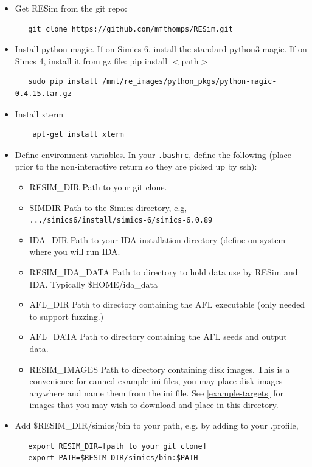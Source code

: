 \documentclass[titlepage]{article}
\begin{document}
\begin{itemize}
\item Get RESim from the git repo:
\begin{verbatim}
   git clone https://github.com/mfthomps/RESim.git
\end{verbatim}
\item Install python-magic.  If on Simics 6, install the standard python3-magic.  If on Simcs 4, install it from gz file:  pip install $<$path$>$
\begin{verbatim}
   sudo pip install /mnt/re_images/python_pkgs/python-magic-0.4.15.tar.gz
\end{verbatim}
\item Install xterm
\begin{verbatim}
    apt-get install xterm
\end{verbatim}
\item Define environment variables.  In your {\tt .bashrc}, define the following (place prior to the 
non-interactive return so they are picked up by ssh):
\begin{itemize}
\item RESIM\_DIR  Path to your git clone.
\item SIMDIR  Path to the Simics directory, e.g, {\tt .../simics6/install/simics-6/simics-6.0.89}
\item IDA\_DIR Path to your IDA installation directory (define on system where you will run IDA.
\item RESIM\_IDA\_DATA Path to directory to hold data use by RESim and IDA.  Typically \$HOME/ida\_data
\item AFL\_DIR Path to directory containing the AFL executable (only needed to support fuzzing.)
\item AFL\_DATA Path to directory containing the AFL seeds and output data.
\item RESIM\_IMAGES Path to directory containing disk images.  This is a convenience for canned example ini files,
you may place disk images anywhere and name them from the ini file.  See \ref{example-targets} for images that you may
wish to download and place in this directory.
\end{itemize}
\item Add \$RESIM\_DIR/simics/bin to your path, e.g. by adding to your .profile,
\begin{verbatim}
   export RESIM_DIR=[path to your git clone]
   export PATH=$RESIM_DIR/simics/bin:$PATH
\end{verbatim}

\end{itemize}
\end{document}
